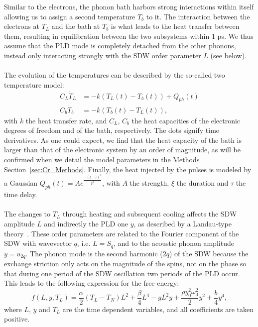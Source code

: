 Similar to the electrons, the phonon bath harbors strong interactions within itself allowing us to assign a second temperature $T_b$ to it.
The interaction between the electrons at $T_L$ and the bath at $T_b$ is what leads to the heat transfer between them, resulting in equilibration between the two subsystems within 1 ps.
We thus assume that the PLD mode is completely detached from the other phonons, instead only interacting strongly with the SDW order parameter $L$ (see below). 
\\\\
The evolution of the temperatures can be described by the so-called two temperature model:
\begin{align}
	\label{eq:Cr_twotemp}
	C_L \dot{T}_L &= -k(T_L(t) - T_b(t)) + Q_{ph}(t) \\
	C_b \dot{T}_b &= -k(T_b(t) - T_L(t)),\nonumber
\end{align}
with $k$ the heat transfer rate, and $C_L$, $C_b$ the heat capacities of the electronic degrees of freedom and of the bath, respectively.
The dots signify time derivatives.
As one could expect, we find that the heat capacity of the bath is larger than that of the electronic system by an order of magnitude, as will be confirmed when we detail the model parameters in the Methods Section~\ref{sec:Cr_Methods}.
Finally, the heat injected by the pulses is modeled by a Gaussian $Q_{ph}(t) = A e^{\frac{-(t - \tau)^2}{\xi^2}}$, with $A$ the strength, $\xi$ the duration and $\tau$ the time delay.
\\\\
The changes to $T_L$ through heating and subsequent cooling affects the SDW amplitude $L$ and indirectly the PLD one $y$, as described by a Landau-type theory~\cite{Khomskii2010}.
These order parameters are related to the Fourier component of the SDW with wavevector $q$, i.e. $L = S_q$, and to the acoustic phonon amplitude $y = u_{2q}$.
The phonon mode is the second harmonic ($2q$) of the SDW because the exchange striction only acts on the magnitude of the spins, not on the phase so that during one period of the SDW oscillation two periods of the PLD occur.
This leads to the following expression for the free energy:
\begin{equation}
	\label{eq:Cr_landau}
	f(L, y, T_L) = \frac{\alpha}{2}(T_L - T_N) L^2 + \frac{\beta}{4} L^4 - g L^2 y + \frac{\rho y_0^2 \omega_0^2}{2} y^2 + \frac{b}{4} y^4,
\end{equation}
where $L$, $y$ and $T_L$ are the time dependent variables, and all coefficients are taken positive.
